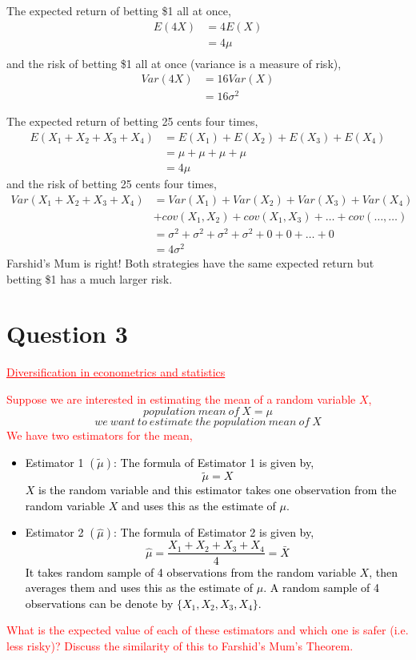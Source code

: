 \documentclass[12pt]{report}
\begin{document}
\noindent The expected return of betting \$1 all at once,
\begin{align*}
	E(4X)&=4E(X) \\
	&=4\mu \\
\end{align*}
\noindent and the risk of betting \$1 all at once (variance is a measure of risk),
\begin{align*}
Var(4X)&=16Var(X) \\
&=16\sigma^2
\end{align*}

\noindent The expected return of betting 25 cents four times,
\begin{align*}
E(X_1+X_2+X_3+X_4)&=E(X_1)+E(X_2)+E(X_3)+E(X_4) \\
&=\mu+\mu+\mu+\mu \\
&=4\mu
\end{align*}
\noindent and the risk of betting 25 cents four times,
\begin{align*}
Var(X_1+X_2+X_3+X_4)&=Var(X_1)+Var(X_2)+Var(X_3)+Var(X_4) \\
&+cov(X_1,X_2)+cov(X_1,X_3)+\dots+cov(\dots,\dots)  \\
&=\sigma^2+\sigma^2+\sigma^2+\sigma^2+0+0+\dots+0 \\
&=4\sigma^2
\end{align*}
\noindent Farshid's Mum is right! Both strategies have the same expected return but betting \$1 has a much larger risk. 

\newpage
\section*{Question 3}
\textcolor{red}{\underline{Diversification in econometrics and statistics}}

\noindent \textcolor{red}{Suppose we are interested in estimating the mean of a random variable $X$,}
\noindent $$population\ mean\ of\ X = \mu$$
\noindent $$we\ want\ to\ estimate\ the\ population\ mean\ of\ X$$
\noindent \textcolor{red}{We have two estimators for the mean,}
\noindent \textcolor{black}{\begin{itemize}
		\item Estimator 1 $(\tilde{\mu})$: The formula of Estimator 1 is given by, $$\tilde{\mu} = X$$  $X$ is the random variable and this estimator takes one observation from the random variable $X$ and uses this as the estimate of $\mu$. 
		\item Estimator 2 $(\hat{\mu})$: The formula of Estimator 2 is given by, $$\hat{\mu} = \dfrac{X_1+X_2+X_3+X_4}{4} = \bar{X}$$ It takes random sample of 4 observations from the random variable $X$, then averages them and uses this as the estimate of $\mu$. A random sample of 4 observations can be denote by $\{X_1,X_2,X_3,X_4\}$. 
	\end{itemize}}
\noindent \textcolor{red}{What is the expected value of each of these estimators and which one is safer (i.e. less risky)? Discuss the similarity of this to Farshid's Mum's Theorem.}
\end{document}
